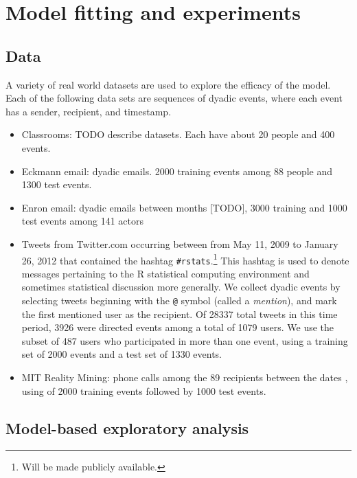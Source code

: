 \section{Model fitting and experiments}
\label{sec:experiments}

\subsection{Data}

A variety of real world datasets are used to explore the efficacy of the model.  Each of the following data sets are sequences of dyadic events, where each event has a sender, recipient, and timestamp.  

\begin{itemize}
\item Classrooms: TODO describe datasets. Each have about 20 people and 400 events.  \cite{McFarland2001}
\item Eckmann email: dyadic emails.  2000 training events among 88 people and 1300 test events.  \cite{Eckmann2004}
\item Enron email: dyadic emails between months [TODO], 3000 training and 1000 test events among 141 actors \cite{Klimt2004}
\item Tweets from Twitter.com occurring between from May 11, 2009 to January 26, 2012 that contained the hashtag \texttt{\#rstats}.\footnote{Will be made publicly available.}  This hashtag is used to denote messages pertaining to the R statistical computing environment and sometimes statistical discussion more generally.  We collect dyadic events by selecting tweets beginning with the \texttt{@} symbol (called a \emph{mention}), and mark the first mentioned user as the recipient.
Of 28337 total tweets in this time period, 3926 were directed events among a total of 1079 users.
We use the subset of 487 users who participated in more than one event, using a training set of 2000 events and a test set of 1330 events.
\item MIT Reality Mining: phone calls among the 89 recipients between the dates , using of 2000 training events followed by 1000 test events. \cite{Eagle2009}
\end{itemize}

\subsection{Model-based exploratory analysis}

